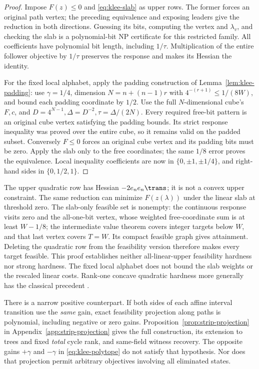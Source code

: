 \begin{proof}
Impose \(F(z)\le0\) and \eqref{eq:klee-slab} as upper rows. The former forces
an original path vertex; the preceding equivalence and exposing leaders give
the reduction in both directions. Guessing its bits, computing the vertex and
\(\lambda_v\), and checking the slab is a polynomial-bit NP certificate for
this restricted family. All coefficients have polynomial bit length, including
\(1/\tau\). Multiplication of the entire follower objective by \(1/\tau\)
preserves the response and makes its Hessian the identity.

For the fixed local alphabet, apply the padding construction of
Lemma~\ref{lem:klee-padding}: use \(\gamma=1/4\), dimension
\(N=n+(n-1)r\) with \(4^{-(r+1)}\le1/(8W)\), and bound each padding
coordinate by \(1/2\). Use the full \(N\)-dimensional cube's \(F,c\), and
\(D=4^{N-1},\Delta=D^{-2},\tau=\Delta/(2N)\). Every required free-bit
pattern is an original cube vertex satisfying the padding bounds. Its strict
response inequality was proved over the entire cube, so it remains valid on
the padded subset. Conversely \(F\le0\) forces an original cube vertex and
its padding bits must be zero. Apply the slab only to the free coordinates;
the same \(1/8\) error proves the equivalence. Local inequality coefficients
are now in \(\{0,\pm1,\pm1/4\}\), and right-hand sides in \(\{0,1/2,1\}\).
\end{proof}
The upper quadratic row has Hessian \(-2e_ne_n\trans\); it is not a convex
upper constraint. The same reduction can minimize \(F(z(\lambda))\) under the
linear slab at threshold zero. The slab-only feasible set is nonempty: the
continuous response visits zero and the all-one-bit vertex, whose weighted
free-coordinate sum is at least \(W-1/8\); the intermediate value theorem
covers integer targets below \(W\), and that last vertex covers \(T=W\).
Its compact feasible graph gives attainment. Deleting the quadratic row from
the feasibility version therefore makes every target feasible. This proof
establishes neither all-linear-upper feasibility hardness nor strong hardness.
The fixed local alphabet does not bound the slab weights or the rescaled
linear costs. Rank-one concave quadratic hardness more generally has the
classical precedent \citet{PardalosVavasis1991}.

There is a narrow positive counterpart. If both sides of each affine interval
transition use the \emph{same} gain, exact feasibility projection along paths
is polynomial, including negative or zero gains. Proposition~\ref{prop:strip-projection}
in Appendix~\ref{app:strip-projection} gives the full construction, its extension
to trees and fixed \emph{total} cycle rank, and same-field witness recovery.
The opposite gains \(+\gamma\) and \(-\gamma\) in
\eqref{eq:klee-polytope} do not satisfy that hypothesis. Nor does that
projection permit arbitrary objectives involving all eliminated states.

